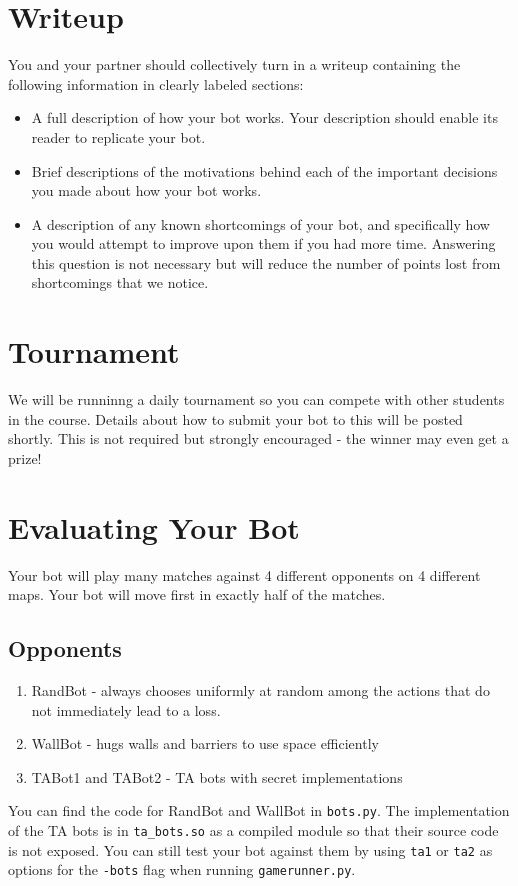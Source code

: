 \documentclass{article}
\begin{document}
\section{Writeup}
You and your partner should collectively turn in a writeup containing the following information in clearly labeled sections:

\begin{itemize}
\item A full description of how your bot works. Your description should enable its reader to replicate your bot.

\item Brief descriptions of the motivations behind each of the important decisions you made about how your bot works.

\item A description of any known shortcomings of your bot, and specifically how you would attempt to improve upon them if you had more time. Answering this question is not necessary but will reduce the number of points lost from shortcomings that we notice.
\end{itemize}

\section{Tournament}
We will be runninng a daily tournament so you can compete with other students in the course.
Details about how to submit your bot to this will be posted shortly.
This is not required but strongly encouraged - the winner may even get a prize!

\section{Evaluating Your Bot}
Your bot will play many matches against 4 different opponents on 4 different maps.
Your bot will move first in exactly half of the matches.

\subsection{Opponents}
\begin{enumerate}
    \item RandBot - always chooses uniformly at random among the actions that do not immediately lead to a loss.

    \item WallBot - hugs walls and barriers to use space efficiently

    \item TABot1 and TABot2 - TA bots with secret implementations
\end{enumerate}
You can find the code for RandBot and WallBot in \verb|bots.py|. The implementation of the TA bots is in \verb|ta_bots.so| as a compiled module so that their source code is not exposed. You can still test your bot against them by using \texttt{ta1} or \texttt{ta2} as options for the \texttt{-bots} flag when running \texttt{gamerunner.py}.
\end{document}
